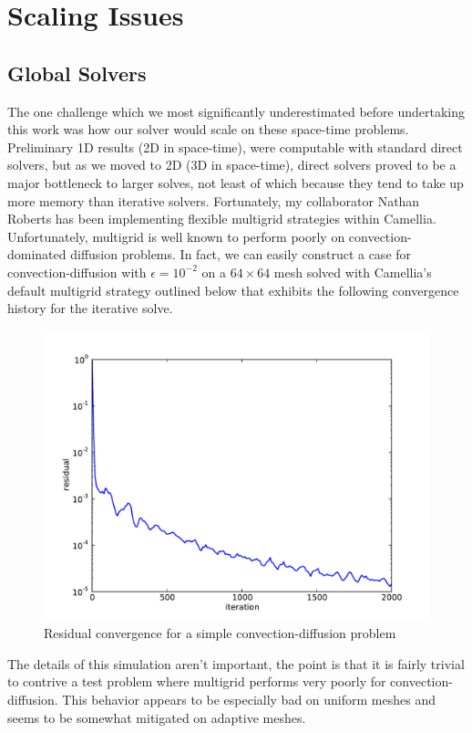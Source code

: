 \documentclass[Dissertation.tex]{subfiles}
\begin{document}
\graphicspath{{../Figures/}}
\chapter{Scaling Issues}
\label{sec:Scaling}

\section{Global Solvers}
The one challenge which we most significantly underestimated before undertaking this work 
was how our solver would scale on these space-time problems.
Preliminary 1D results (2D in space-time), were computable with standard direct solvers,
but as we moved to 2D (3D in space-time), direct solvers proved to be a major bottleneck
to larger solves, not least of which because they tend to take up more memory than iterative solvers.
Fortunately, my collaborator Nathan Roberts has been implementing 
flexible multigrid strategies within Camellia.
Unfortunately, multigrid is well known to perform poorly on convection-dominated diffusion problems.
In fact, we can easily construct a case for convection-diffusion with $\epsilon=10^{-2}$ on a $64\times64$
mesh solved with Camellia's default multigrid strategy outlined below that
exhibits the following convergence history for the iterative solve.
\begin{figure}
\centering
\includegraphics[width=\textwidth]{Dissertation/Scaling/ConfusionResidual.pdf}
\caption{Residual convergence for a simple convection-diffusion problem}
\label{fig:ConfusionResidual}
\end{figure}
The details of this simulation aren't important, the point is that it is fairly trivial to contrive a 
test problem where multigrid performs very poorly for convection-diffusion.
This behavior appears to be especially bad on uniform meshes and seems to be somewhat mitigated on adaptive meshes.
\end{document}
